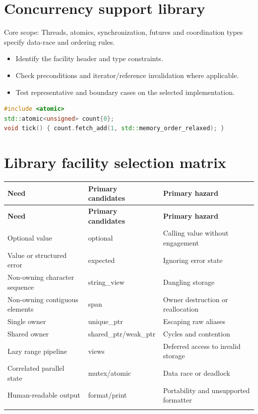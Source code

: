 \documentclass[11pt]{article}
\begin{document}
\section{Concurrency support library}
Core scope: Threads, atomics, synchronization, futures and coordination types specify data-race and ordering rules.

\begin{itemize}[leftmargin=*,itemsep=1pt,topsep=3pt]
\item Identify the facility header and type constraints.
\item Check preconditions and iterator/reference invalidation where applicable.
\item Test representative and boundary cases on the selected implementation.
\end{itemize}
\begin{lstlisting}[language=C++]
#include <atomic>
std::atomic<unsigned> count{0};
void tick() { count.fetch_add(1, std::memory_order_relaxed); }
\end{lstlisting}
\section{Library facility selection matrix}
\small
\begin{longtable}{@{}>{\raggedright\arraybackslash}p{.22\linewidth}>{\raggedright\arraybackslash}p{.34\linewidth}>{\raggedright\arraybackslash}p{}@{}}
\toprule
\textbf{Need} & \textbf{Primary candidates} & \textbf{Primary hazard}\\
\midrule
\endfirsthead
\toprule
\textbf{Need} & \textbf{Primary candidates} & \textbf{Primary hazard}\\
\midrule
\endhead
Optional value & optional & Calling value without engagement\\
\addlinespace[2pt]
Value or structured error & expected & Ignoring error state\\
\addlinespace[2pt]
Non-owning character sequence & string\_view & Dangling storage\\
\addlinespace[2pt]
Non-owning contiguous elements & span & Owner destruction or reallocation\\
\addlinespace[2pt]
Single owner & unique\_ptr & Escaping raw aliases\\
\addlinespace[2pt]
Shared owner & shared\_ptr/weak\_ptr & Cycles and contention\\
\addlinespace[2pt]
Lazy range pipeline & views & Deferred access to invalid storage\\
\addlinespace[2pt]
Correlated parallel state & mutex/atomic & Data race or deadlock\\
\addlinespace[2pt]
Human-readable output & format/print & Portability and unsupported formatter\\
\addlinespace[2pt]
\bottomrule
\end{longtable}
\normalsize
\docend
\end{document}

